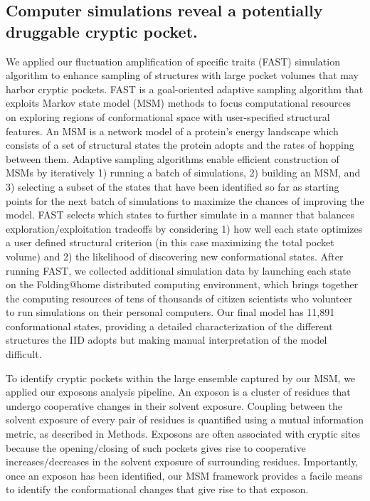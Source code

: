 \documentclass[../main.tex]{subfiles}
\begin{document}
    \subsection{Computer simulations reveal a potentially druggable cryptic pocket.}
        We applied our fluctuation amplification of specific traits (FAST) simulation algorithm\cite{zimmerman_fast_2015} to enhance sampling of structures with large pocket volumes that may harbor cryptic pockets. FAST is a goal-oriented adaptive sampling algorithm that exploits Markov state model (MSM) methods to focus computational resources on exploring regions of conformational space with user-specified structural features. An MSM is a network model of a protein’s energy landscape which consists of a set of structural states the protein adopts and the rates of hopping between them\cite{pande_everything_2010,prinz_markov_2011}. Adaptive sampling algorithms enable efficient construction of MSMs by iteratively 1) running a batch of simulations, 2) building an MSM, and 3) selecting a subset of the states that have been identified so far as starting points for the next batch of simulations to maximize the chances of improving the model\cite{bowman_network_2010,Hruska:2018ec}. FAST selects which states to further simulate in a manner that balances exploration/exploitation tradeoffs by considering 1) how well each state optimizes a user defined structural criterion (in this case maximizing the total pocket volume) and 2) the likelihood of discovering new conformational states\cite{zimmerman_fast_2015}. After running FAST, we collected additional simulation data by launching each state on the Folding@home distributed computing environment, which brings together the computing resources of tens of thousands of citizen scientists who volunteer to run simulations on their personal computers. Our final model has 11,891 conformational states, providing a detailed characterization of the different structures the IID adopts but making manual interpretation of the model difficult.

        To identify cryptic pockets within the large ensemble captured by our MSM, we applied our exposons analysis pipeline\cite{Porter:2019hv}. An exposon is a cluster of residues that undergo cooperative changes in their solvent exposure. Coupling between the solvent exposure of every pair of residues is quantified using a mutual information metric, as described in Methods. Exposons are often associated with cryptic sites because the opening/closing of such pockets gives rise to cooperative increases/decreases in the solvent exposure of surrounding residues. Importantly, once an exposon has been identified, our MSM framework provides a facile means to identify the conformational changes that give rise to that exposon.
\end{document}
